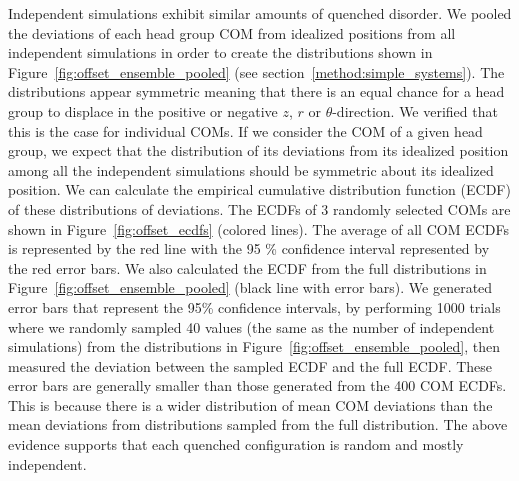 \documentclass[journal=jpcbfk,manuscript=article]{achemso}
\begin{document}
  Independent simulations exhibit similar amounts of quenched disorder. 
  We pooled the deviations of each head group COM from idealized positions
  from all independent simulations in order to create the distributions shown in 
  Figure~\ref{fig:offset_ensemble_pooled} 
  (see section~\ref{method:simple_systems}). The distributions appear 
  symmetric meaning that there is an equal chance for a head group to displace
  in the positive or negative $z$, $r$ or $\theta$-direction. We verified that
  this is the case for individual COMs. 
  If we consider the COM of a given head group, we expect that the
  distribution of its deviations from its idealized position among all the 
  independent simulations
  should be symmetric about its idealized position. We can calculate the 
  empirical cumulative distribution function (ECDF) 
  of these distributions of deviations. 
  The ECDFs of 3 randomly selected COMs
  are shown in Figure~\ref{fig:offset_ecdfs} (colored lines). The average 
  of all COM ECDFs is represented by the red line with the 95 \% confidence
  interval represented by the red error bars. We also calculated 
  the ECDF from the full distributions in Figure~\ref{fig:offset_ensemble_pooled}
  (black line with error bars). We generated error bars that represent the 95\% 
  confidence intervals, by performing 1000 trials where we randomly sampled 40
  values (the same as the number of independent simulations) from the distributions in 
  Figure~\ref{fig:offset_ensemble_pooled}, then measured the deviation between
  the sampled ECDF and the full ECDF. These error bars are generally smaller than
  those generated from the 400 COM ECDFs. This is because there is a wider
  distribution of mean COM deviations than the mean deviations from distributions
  sampled from the full distribution. The above evidence supports that each quenched
  configuration is random and mostly independent.
  
\end{document}
